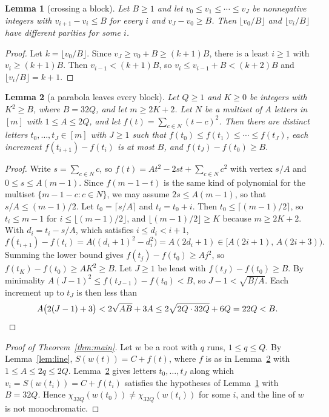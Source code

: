 \documentclass[11pt]{article}
\newtheorem{lemma}{Lemma}
\theoremstyle{remark}
\begin{document}
\begin{lemma}[crossing a block]\label{lem:block}
Let $B\ge1$ and let $v_0\le v_1\le\cdots\le v_J$ be nonnegative integers with $v_{i+1}-v_i\le B$ for every $i$ and $v_J-v_0\ge B$. Then $\lfloor v_0/B\rfloor$ and $\lfloor v_i/B\rfloor$ have different parities for some $i$.
\end{lemma}

\begin{proof}
Let $k=\lfloor v_0/B\rfloor$. Since $v_J\ge v_0+B\ge(k+1)B$, there is a least $i\ge1$ with $v_i\ge(k+1)B$. Then $v_{i-1}<(k+1)B$, so $v_i\le v_{i-1}+B<(k+2)B$ and $\lfloor v_i/B\rfloor=k+1$.
\end{proof}

\begin{lemma}[a parabola leaves every block]\label{lem:parabola}
Let $Q\ge1$ and $K\ge0$ be integers with $K^2\ge B$, where $B=32Q$, and let $m\ge2K+2$. Let $N$ be a multiset of $A$ letters in $[m]$ with $1\le A\le2Q$, and let $f(t)=\sum_{c\in N}(t-c)^2$. Then there are distinct letters $t_0,\ldots,t_J\in[m]$ with $J\ge1$ such that $f(t_0)\le f(t_1)\le\cdots\le f(t_J)$, each increment $f(t_{i+1})-f(t_i)$ is at most $B$, and $f(t_J)-f(t_0)\ge B$.
\end{lemma}

\begin{proof}
Write $s=\sum_{c\in N}c$, so $f(t)=At^2-2st+\sum_{c\in N}c^2$ with vertex $s/A$ and $0\le s\le A(m-1)$. Since $f(m-1-t)$ is the same kind of polynomial for the multiset $\{m-1-c:c\in N\}$, we may assume $2s\le A(m-1)$, so that $s/A\le(m-1)/2$. Let $t_0=\lceil s/A\rceil$ and $t_i=t_0+i$. Then $t_0\le\lceil(m-1)/2\rceil$, so $t_i\le m-1$ for $i\le\lfloor(m-1)/2\rfloor$, and $\lfloor(m-1)/2\rfloor\ge K$ because $m\ge2K+2$. With $d_i=t_i-s/A$, which satisfies $i\le d_i<i+1$,
\[
f(t_{i+1})-f(t_i)=A\big((d_i+1)^2-d_i^2\big)=A(2d_i+1)\in\big[A(2i+1),\,A(2i+3)\big).
\]
Summing the lower bound gives $f(t_j)-f(t_0)\ge Aj^2$, so $f(t_K)-f(t_0)\ge AK^2\ge B$. Let $J\ge1$ be least with $f(t_J)-f(t_0)\ge B$. By minimality $A(J-1)^2\le f(t_{J-1})-f(t_0)<B$, so $J-1<\sqrt{B/A}$. Each increment up to $t_J$ is then less than
\[
A\big(2(J-1)+3\big)<2\sqrt{AB}+3A\le2\sqrt{2Q\cdot32Q}+6Q=22Q<B.\qedhere
\]
\end{proof}

\begin{proof}[Proof of Theorem~\ref{thm:main}]
Let $w$ be a root with $q$ runs, $1\le q\le Q$. By Lemma~\ref{lem:line}, $S(w(t))=C+f(t)$, where $f$ is as in Lemma~\ref{lem:parabola} with $1\le A\le2q\le2Q$. Lemma~\ref{lem:parabola} gives letters $t_0,\ldots,t_J$ along which $v_i=S(w(t_i))=C+f(t_i)$ satisfies the hypotheses of Lemma~\ref{lem:block} with $B=32Q$. Hence $\chi_{32Q}(w(t_0))\ne\chi_{32Q}(w(t_i))$ for some $i$, and the line of $w$ is not monochromatic.
\end{proof}
\end{document}
